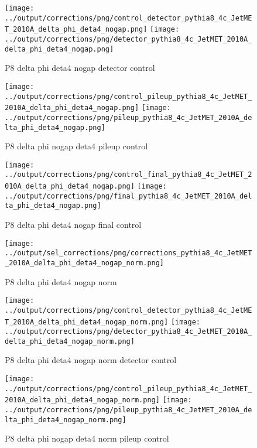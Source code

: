 \documentclass[11pt]{book}
\begin{document}
\begin{figure}[ht]
\centering
\texttt{[image: ../output/corrections/png/control\_detector\_pythia8\_4c\_JetMET\_2010A\_delta\_phi\_deta4\_nogap.png]}
\texttt{[image: ../output/corrections/png/detector\_pythia8\_4c\_JetMET\_2010A\_delta\_phi\_deta4\_nogap.png]}
\caption{P8 delta phi deta4 nogap detector control}
\label{fig:p8_JetMET_2010A_delta_phi_deta4_nogap_detector_control}
\end{figure}

\begin{figure}[ht]
\centering
\texttt{[image: ../output/corrections/png/control\_pileup\_pythia8\_4c\_JetMET\_2010A\_delta\_phi\_deta4\_nogap.png]}
\texttt{[image: ../output/corrections/png/pileup\_pythia8\_4c\_JetMET\_2010A\_delta\_phi\_deta4\_nogap.png]}
\caption{P8 delta phi nogap deta4 pileup control}
\label{fig:p8_JetMET_2010A_delta_phi_deta4_nogap_pileup_control}
\end{figure}


\begin{figure}[ht]
\centering
\texttt{[image: ../output/corrections/png/control\_final\_pythia8\_4c\_JetMET\_2010A\_delta\_phi\_deta4\_nogap.png]}
\texttt{[image: ../output/corrections/png/final\_pythia8\_4c\_JetMET\_2010A\_delta\_phi\_deta4\_nogap.png]}
\caption{P8 delta phi deta4 nogap final control}
\label{fig:p8_JetMET_2010A_delta_phi_deta4_nogap_final_control}
\end{figure}

\begin{figure}[ht]
\centering
\texttt{[image: ../output/sel\_corrections/png/corrections\_pythia8\_4c\_JetMET\_2010A\_delta\_phi\_deta4\_nogap\_norm.png]}
\caption{P8 delta phi deta4 nogap norm}
\label{fig:p8_JetMET_2010A_delta_phi_deta4_nogap_norm}
\end{figure}

\begin{figure}[ht]
\centering
\texttt{[image: ../output/corrections/png/control\_detector\_pythia8\_4c\_JetMET\_2010A\_delta\_phi\_deta4\_nogap\_norm.png]}
\texttt{[image: ../output/corrections/png/detector\_pythia8\_4c\_JetMET\_2010A\_delta\_phi\_deta4\_nogap\_norm.png]}
\caption{P8 delta phi deta4 nogap norm detector control}
\label{fig:p8_JetMET_2010A_delta_phi_deta4_nogap_norm_detector_control}
\end{figure}

\begin{figure}[ht]
\centering
\texttt{[image: ../output/corrections/png/control\_pileup\_pythia8\_4c\_JetMET\_2010A\_delta\_phi\_deta4\_nogap\_norm.png]}
\texttt{[image: ../output/corrections/png/pileup\_pythia8\_4c\_JetMET\_2010A\_delta\_phi\_deta4\_nogap\_norm.png]}
\caption{P8 delta phi nogap deta4 norm pileup control}
\label{fig:p8_JetMET_2010A_delta_phi_deta4_nogap_norm_pileup_control}
\end{figure}
\end{document}
